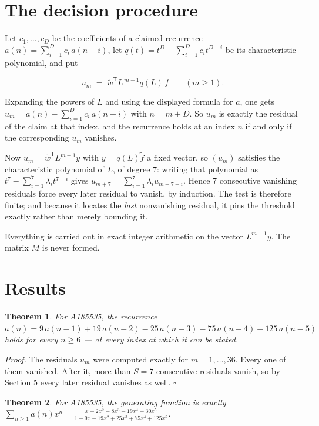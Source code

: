 \documentclass[11pt]{article}
\newtheorem{theorem}{Theorem}
\theoremstyle{definition}
\begin{document}
\section{The decision procedure}

Let $c_1,\dots,c_D$ be the coefficients of a claimed recurrence $a(n) = \sum_{i=1}^{D} c_i\,a(n-i)$, let $q(t) = t^{D} - \sum_{i=1}^{D} c_i t^{D-i}$ be its characteristic polynomial, and put

\[u_m \;=\; \tilde w^{\mathsf T} L^{\,m-1} q(L)\,\tilde f \qquad (m \ge 1).\]

Expanding the powers of $L$ and using the displayed formula for $a$, one gets $u_m = a(n) - \sum_{i=1}^{D} c_i\,a(n-i)$ with $n = m + D$. So $u_m$ is exactly the residual of the claim at that index, and the recurrence holds at an index $n$ if and only if the corresponding $u_m$ vanishes.

Now $u_m = \tilde w^{\mathsf T} L^{m-1} y$ with $y = q(L)\tilde f$ a fixed vector, so $(u_m)$ satisfies the characteristic polynomial of $L$, of degree $7$: writing that polynomial as $t^{7} - \sum_{i=1}^{7} \lambda_i t^{7-i}$ gives $u_{m+7} = \sum_{i=1}^{7} \lambda_i u_{m+7-i}$. Hence $7$ consecutive vanishing residuals force every later residual to vanish, by induction. The test is therefore finite; and because it locates the {\itshape last} nonvanishing residual, it pins the threshold exactly rather than merely bounding it.

Everything is carried out in exact integer arithmetic on the vector $L^{m-1}y$. The matrix $M$ is never formed.

\section{Results}

\begin{theorem} For A185535, the recurrence $a(n) = 9\,a(n-1) + 19\,a(n-2) - 25\,a(n-3) - 75\,a(n-4) - 125\,a(n-5)$ holds for every $n \ge 6$ --- at every index at which it can be stated.\end{theorem}

{\itshape Proof.} The residuals $u_m$ were computed exactly for $m = 1,\dots,36$. Every one of them vanished. After it, more than $S = 7$ consecutive residuals vanish, so by Section 5 every later residual vanishes as well. $\square$

\begin{theorem} For A185535, the generating function is exactly $\sum_{n\ge 1} a(n)x^n = \frac{x + 2x^{2} - 8x^{3} - 19x^{4} - 30x^{5}}{1 - 9x - 19x^{2} + 25x^{3} + 75x^{4} + 125x^{5}}$.\end{theorem}
\end{document}
